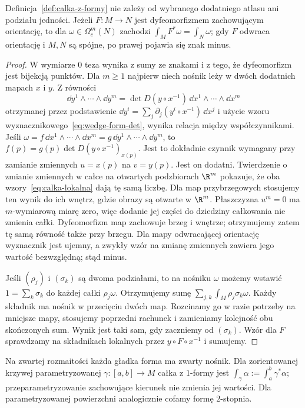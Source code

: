 \begin{twierdzenie}
\label{thm:calka-dobrze-okreslona}
Definicja~\ref{def:calka-z-formy} nie zależy od
wybranego dodatniego atlasu ani podziału jedności.
Jeżeli $F:M\to N$ jest dyfeomorfizmem zachowującym
orientację, to dla $\omega\in\Omega_c^m(N)$ zachodzi
$\int_M F^*\omega=\int_N\omega$; gdy $F$ odwraca
orientację i $M,N$ są spójne, po prawej pojawia się
znak minus.
\end{twierdzenie}
\begin{proof}
W wymiarze $0$ teza wynika z sumy ze znakami i z tego,
że dyfeomorfizm jest bijekcją punktów. Dla $m\geq1$
najpierw niech nośnik leży w dwóch dodatnich mapach
$x$ i $y$. Z równości
\[
 \dd y^1\wedge\cdots\wedge\dd y^m
 =\det D(y\circ x^{-1})\,
   \dd x^1\wedge\cdots\wedge\dd x^m
\]
otrzymanej przez podstawienie
$\dd y^i=\sum_j\partial_j(y^i\circ x^{-1})\,\dd x^j$
i użycie wzoru wyznacznikowego~\eqref{eq:wedge-form-det},
wynika relacja między współczynnikami.
Jeśli $\omega=f\,\dd x^1\wedge\cdots\wedge\dd x^m
=g\,\dd y^1\wedge\cdots\wedge\dd y^m$, to
$f(p)=g(p)\det D(y\circ x^{-1})_{x(p)}$.
Jest to dokładnie czynnik wymagany przy zamianie
zmiennych $u=x(p)$ na $v=y(p)$.
Jest on dodatni. Twierdzenie o zmianie zmiennych
w całce na otwartych podzbiorach $\R^m$ pokazuje,
że oba wzory~\eqref{eq:calka-lokalna} dają tę samą
liczbę. Dla map przybrzegowych stosujemy ten wynik
do ich wnętrz, gdzie obrazy są otwarte w $\R^m$.
Płaszczyzna $u^m=0$ ma $m$-wymiarową miarę zero,
więc dodanie jej części do dziedziny całkowania
nie zmienia całki. Dyfeomorfizm map zachowuje brzeg
i wnętrze; otrzymujemy zatem tę samą równość także
przy brzegu. Dla mapy odwracającej orientację wyznacznik
jest ujemny, a zwykły wzór na zmianę zmiennych
zawiera jego wartość bezwzględną; stąd minus.

Jeśli $(\rho_j)$ i $(\sigma_k)$ są dwoma podziałami,
to na nośniku $\omega$ możemy wstawić
$1=\sum_k\sigma_k$ do każdej całki $\rho_j\omega$.
Otrzymujemy sumę $\sum_{j,k}\int_M\rho_j\sigma_k\omega$.
Każdy składnik ma nośnik w przecięciu dwóch map.
Rozcinamy go w razie potrzeby na mniejsze mapy,
stosujemy poprzedni rachunek i zamieniamy kolejność
obu skończonych sum. Wynik jest taki sam, gdy
zaczniemy od $(\sigma_k)$. Wzór dla $F$ sprawdzamy
na składnikach lokalnych przez $y\circ F\circ x^{-1}$
i sumujemy.
\end{proof}

Na zwartej rozmaitości każda gładka forma ma zwarty
nośnik. Dla zorientowanej krzywej parametryzowanej
$\gamma:[a,b]\to M$ całka z $1$-formy jest
$\int_\gamma\alpha:=\int_a^b\gamma^*\alpha$;
przeparametryzowanie zachowujące kierunek nie zmienia
jej wartości. Dla parametryzowanej powierzchni
analogicznie cofamy formę $2$-stopnia.


